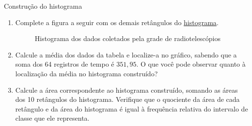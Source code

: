 {\begin{task}{Construção do histograma}
\begin{enumerate}
\item Complete a figura a seguir com os demais retângulos do \hyperref[est1-fig-10]{histograma}.

\begin{figure}[H]
\centering

\caption{Histograma dos dados coletados pela grade de radiotelescópios}
\label{est1-fig-10}
\end{figure}

\item Calcule a média dos dados da tabela e localize-a no gráfico, sabendo que a soma dos 64 registros de tempo é $351{,}95$. O que você pode observar quanto à localização da média no histograma construído?

\item Calcule a área correspondente ao histograma construído, somando as áreas dos 10 retângulos do histograma. Verifique que o quociente da área de cada retângulo e da área do histograma é igual à frequência relativa do intervalo de classe que ele representa.

\end{enumerate}





\end{task}}
